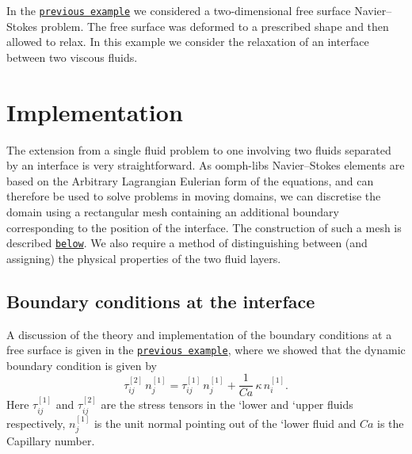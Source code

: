 In the \href{../../single_layer_free_surface/html/index.html}{\tt previous example} we considered a two-\/dimensional free surface Navier--Stokes problem. The free surface was deformed to a prescribed shape and then allowed to relax. In this example we consider the relaxation of an interface between two viscous fluids.



 

\hypertarget{index_implementation}{}\section{Implementation}\label{index_implementation}
The extension from a single fluid problem to one involving two fluids separated by an interface is very straightforward. As {\ttfamily oomph-\/lib\textquotesingle{}s} Navier--Stokes elements are based on the Arbitrary Lagrangian Eulerian form of the equations, and can therefore be used to solve problems in moving domains, we can discretise the domain using a rectangular mesh containing an additional boundary corresponding to the position of the interface. The construction of such a mesh is described \href{#mesh}{\tt below}. We also require a method of distinguishing between (and assigning) the physical properties of the two fluid layers.\hypertarget{index_interface_eqns}{}\subsection{Boundary conditions at the interface}\label{index_interface_eqns}
A discussion of the theory and implementation of the boundary conditions at a free surface is given in the \href{../../single_layer_free_surface/html/index.html#free_surface_eqns}{\tt previous example}, where we showed that the dynamic boundary condition is given by \[ \tau_{ij}^{[2]} \, n_j^{[1]} = \tau_{ij}^{[1]} \, n_j^{[1]} + \frac{1}{Ca} \, \kappa \, n_i^{[1]}. \] Here $ \tau_{ij}^{[1]} $ and $ \tau_{ij}^{[2]} $ are the stress tensors in the `lower\textquotesingle{} and `upper\textquotesingle{} fluids respectively, $ n_j^{[1]} $ is the unit normal pointing out of the `lower\textquotesingle{} fluid and $ Ca $ is the Capillary number.


